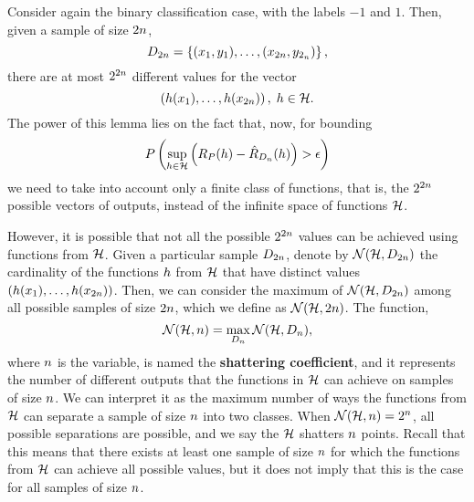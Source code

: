 %
Consider again the binary classification case, with the labels $-1$ and $1$. Then, given a sample of size $2 n$,
$$ D_{2n} = \left\{(x_1, y_1), \ldots, (x_{2 n}, y_{2_n})\right\} ,$$
there are at most $2^{2n}$ different values for the vector 
$$ \left(h(x_1), \ldots, h(x_{2 n})  \right), \; h \in \mathcal{H} .$$
%
The power of this lemma lies on the fact that, now, for bounding 
$$ P\left(\sup_{h \in \mathcal{H}} \left(R_P(h) - \hat{R}_{D_{n}}(h) \right) > \epsilon \right) $$
we need to take into account only a finite class of functions, that is, the $2^{2 n}$ possible vectors of outputs, instead of the infinite space of functions $\mathcal{H}$.
%

However, it is possible that not all the possible $2^{2 n}$ values can be achieved using functions from $\mathcal{H}$. Given a particular sample $D_{2 n}$, denote by $\mathcal{N}(\mathcal{H}, D_{2n})$ the cardinality of the functions $h$ from $\mathcal{H}$ that have distinct values $({h(x_1), \ldots, h(x_{2 n})})$. Then, we can consider the maximum of $\mathcal{N}(\mathcal{H}, D_{2n})$ among all possible samples of size $2 n$, which we define as $\mathcal{N}(\mathcal{H}, 2n)$.
%
The function, $$\mathcal{N}(\mathcal{H}, n) = \max_{D_n} \mathcal{N}(\mathcal{H}, D_{n}), $$ where $n$ is the variable, is named the \textbf{shattering coefficient}, and it represents the number of different outputs that the functions in $\mathcal{H}$ can achieve on samples of size $n$. We can interpret it as the maximum number of ways the functions from $\mathcal{H}$ can separate a sample of size $n$ into two classes.
%
When $\mathcal{N}(\mathcal{H}, n) = 2^n$, all possible separations are possible, and we say the $\mathcal{H}$ shatters $n$ points. Recall that this means that there exists at least one sample of size $n$ for which the functions from $\mathcal{H}$ can achieve all possible values, but it does not imply that this is the case for all samples of size $n$.



